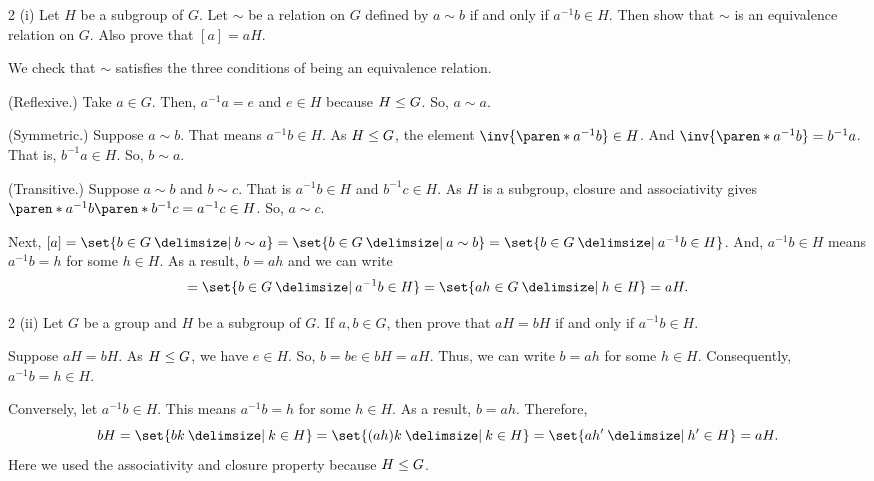 \documentclass[11pt]{penrose}
\begin{document}
\begin{problem}{2 (i)}
    Let $H$ be a subgroup of $G$. Let $\sim$ be a relation on $G$ defined by $a \sim b$ if and only if $a^{-1} b \in H$. Then show that $\sim$ is an equivalence relation on $G$. Also prove that $[a] = aH$.

    \solution We check that $\sim$ satisfies the three conditions of being an equivalence relation.
    
    (Reflexive.) Take $a \in G$. Then, $a^{-1} a = e$ and $e \in H$ because $H \mathrel{\leq} G$. So, $a \sim a$.

    (Symmetric.) Suppose $a \sim b$. That means $a^{-1} b \in H$. As $H \mathrel{\leq} G$, the element $\inv{\paren*{a^{-1} b}} \in H$. And $\inv{\paren*{a^{-1} b}} = b^{-1} a$. That is, $b^{-1} a \in H$. So, $b \sim a$.

    (Transitive.) Suppose $a \sim b$ and $b \sim c$. That is $a^{-1} b \in H$ and $b^{-1} c \in H$. As $H$ is a subgroup, closure and associativity gives $\paren*{a^{-1} b} \paren*{b^{-1} c} = a^{-1} c \in H$. So, $a \sim c$.

    Next, $[a] = \set{b \in G \st b \sim a} = \set{b \in G \st a \sim b} = \set{b \in G \st a^{-1} b \in H}$. And, $a^{-1} b \in H$ means $a^{-1} b = h$ for some $h \in H$. As a result, $b = ah$ and we can write
    \begin{equation*}
        [a] = \set{b \in G \st a^{-1} b \in H} = \set{ah \in G \st h \in H} = aH.
    \end{equation*}
\end{problem}

\begin{problem}{2 (ii)}
    Let $G$ be a group and $H$ be a subgroup of $G$. If $a, b \in G$, then prove that $aH = bH$ if and only if $a^{-1} b \in H$.

    \solution Suppose $aH = bH$. As $H \mathrel{\leq} G$, we have $e \in H$. So, $b = be \in bH = aH$. Thus, we can write $b = ah$ for some $h \in H$. Consequently, $a^{-1} b = h \in H$.

    Conversely, let $a^{-1} b \in H$. This means $a^{-1} b = h$ for some $h \in H$. As a result, $b = ah$. Therefore,
    \begin{equation*}
        bH = \set{bk \st k \in H} = \set{(ah)k \st k \in H} = \set{ah' \st h' \in H} = aH.
    \end{equation*}
    Here we used the associativity and closure property because $H \mathrel{\leq} G$.
\end{problem}
\end{document}
